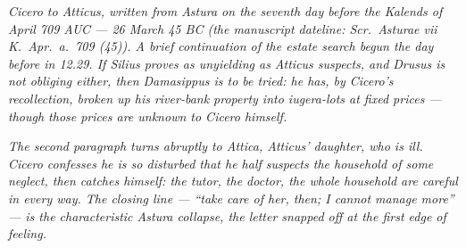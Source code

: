 
\textit{Cicero to Atticus, written from Astura on the
seventh day before the Kalends of April 709 AUC ---
26 March 45 BC (the manuscript dateline:
\textit{Scr.\ Asturae vii K.\ Apr.\ a.\ 709 (45)}).
A brief continuation of the estate search begun the
day before in 12.29. If Silius proves as unyielding
as Atticus suspects, and Drusus is not obliging
either, then Damasippus is to be tried: he has, by
Cicero's recollection, broken up his river-bank
property into iugera-lots at fixed prices --- though
those prices are unknown to Cicero himself.}

\textit{The second paragraph turns abruptly to
Attica, Atticus' daughter, who is ill. Cicero
confesses he is so disturbed that he half suspects
the household of some neglect, then catches himself:
the tutor, the doctor, the whole household are
careful in every way. The closing line --- ``take
care of her, then; I cannot manage more'' --- is the
characteristic Astura collapse, the letter snapped
off at the first edge of feeling.}
